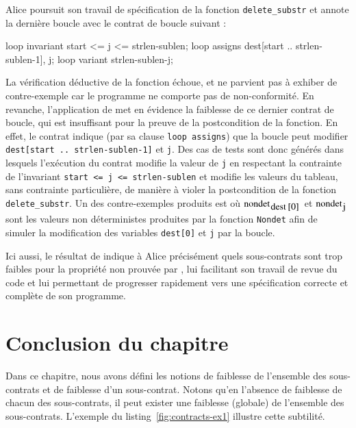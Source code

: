 Alice poursuit son travail de spécification de la fonction
\lstinline'delete_substr' et annote la dernière boucle avec le contrat de boucle
suivant :

\begin{pretty-codeACSL}
loop invariant start <= j <= strlen-sublen;
loop assigns dest[start .. strlen-sublen-1], j;
loop variant strlen-sublen-j;
\end{pretty-codeACSL}

La vérification déductive de la fonction échoue, et \NCD ne parvient pas à
exhiber de contre-exemple car le programme ne comporte pas de non-conformité.
En revanche, l'application de \SWD met en évidence la faiblesse de ce dernier
contrat de boucle, qui est insuffisant pour la preuve de la postcondition de la
fonction.
En effet, le contrat indique (par sa clause \lstinline'loop assigns') que la
boucle peut modifier \lstinline'dest[start .. strlen-sublen-1]' et
\lstinline'j'.
Des cas de tests sont donc générés dans lesquels l'exécution du
contrat modifie la valeur de \lstinline'j' en respectant la contrainte de
l'invariant \lstinline'start <= j <= strlen-sublen' et modifie les valeurs du
tableau, sans contrainte particulière, de manière à violer la postcondition de
la fonction \lstinline'delete_substr'.
Un des contre-exemples produits est  où $\mbox{\lstinline'nondet'}_{\mbox{\lstinline'dest[0]'}}$ et
$\mbox{\lstinline'nondet'}_{\mbox{\lstinline'j'}}$ sont les valeurs non
déterministes produites par la fonction \lstinline'Nondet' afin de simuler la
modification des variables \lstinline'dest[0]' et \lstinline'j' par la boucle.

Ici aussi, le résultat de \SWD indique à Alice précisément quels
sous-contrats sont trop faibles pour la propriété non prouvée par \Wp, lui
facilitant son travail de revue du code et lui permettant de progresser
rapidement vers une spécification correcte et complète de son programme.


\section*{Conclusion du chapitre}


Dans ce chapitre, nous avons défini les notions de faiblesse de l'ensemble des
sous-contrats et de faiblesse d'un sous-contrat.
Notons qu'en l'absence de faiblesse de chacun des sous-contrats, il peut exister
une faiblesse (globale) de l'ensemble des sous-contrats.
L'exemple du listing~\ref{fig:contracts-ex1} illustre cette subtilité.

